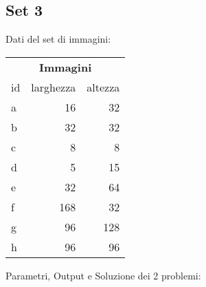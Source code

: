 \newpage



\subsection{Set 3}
Dati del set di immagini:  \\

\begin{table}[H]
\centering
\footnotesize
\begin{tabular}{l|r|r}
\multicolumn{3}{c}{\textbf{Immagini}} \\ 
id & larghezza & altezza \\
\hline
a & 16 & 32 \\
b & 32&32\\
c & 8& 8\\
d & 5&15\\
e & 32&64\\
f & 168 &32\\
g & 96&128\\
h & 96& 96\\
\end{tabular}
\end{table}


\noindent Parametri, Output e Soluzione dei 2 problemi: 

